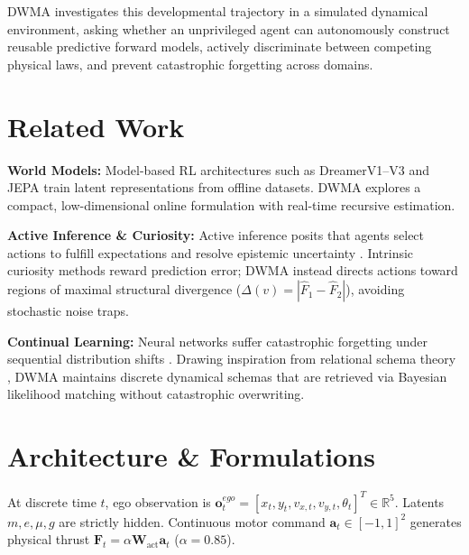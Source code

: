 \documentclass[10pt,twocolumn,a4paper]{article}
\begin{document}
DWMA investigates this developmental trajectory in a simulated dynamical environment, asking whether an unprivileged agent can autonomously construct reusable predictive forward models, actively discriminate between competing physical laws, and prevent catastrophic forgetting across domains.

\section{Related Work}
\textbf{World Models:} Model-based RL architectures such as DreamerV1--V3 \cite{hafner2020,hafner2023} and JEPA \cite{lecun2022} train latent representations from offline datasets. DWMA explores a compact, low-dimensional online formulation with real-time recursive estimation.

\textbf{Active Inference \& Curiosity:} Active inference posits that agents select actions to fulfill expectations and resolve epistemic uncertainty \cite{friston2015,friston2017,buckley2021}. Intrinsic curiosity methods \cite{oudeyer2007,pathak2017,burda2018} reward prediction error; DWMA instead directs actions toward regions of maximal structural divergence ($\Delta(v) = |\hat{F}_1 - \hat{F}_2|$), avoiding stochastic noise traps.

\textbf{Continual Learning:} Neural networks suffer catastrophic forgetting under sequential distribution shifts \cite{french1999,kirkpatrick2017}. Drawing inspiration from relational schema theory \cite{whittington2020}, DWMA maintains discrete dynamical schemas that are retrieved via Bayesian likelihood matching without catastrophic overwriting.

\section{Architecture \& Formulations}
At discrete time $t$, ego observation is $\mathbf{o}_t^{ego} = [x_t, y_t, v_{x,t}, v_{y,t}, \theta_t]^T \in \mathbb{R}^5$. Latents $m, e, \mu, g$ are strictly hidden. Continuous motor command $\mathbf{a}_t \in [-1, 1]^2$ generates physical thrust $\mathbf{F}_t = \alpha \mathbf{W}_{\text{act}} \mathbf{a}_t$ ($\alpha = 0.85$). 
\end{document}
